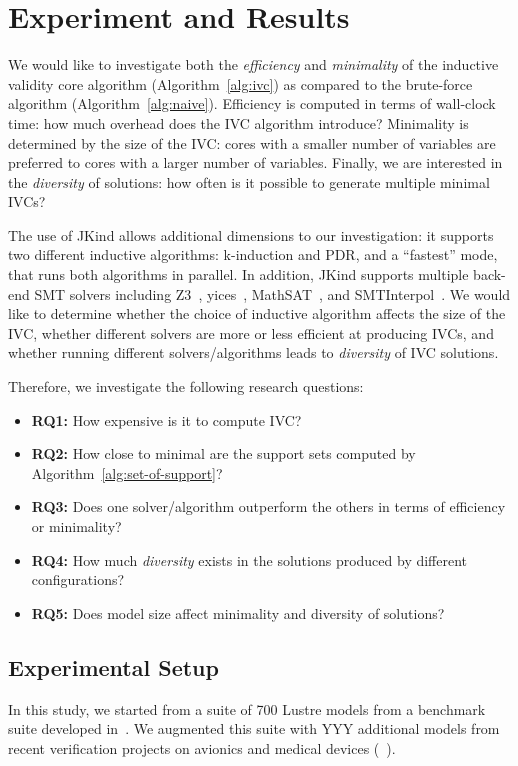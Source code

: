 \section{Experiment and Results}
\label{sec:exprm}

We would like to investigate both the {\em efficiency} and {\em minimality} of the inductive validity core algorithm (Algorithm~\ref{alg:ivc}) as compared to the brute-force algorithm (Algorithm~\ref{alg:naive}).  Efficiency is computed in terms of wall-clock time: how much overhead does the IVC algorithm introduce?  Minimality is determined by the size of the IVC: cores with a smaller number of variables are preferred to cores with a larger number of variables.  Finally, we are interested in the {\em diversity} of solutions: how often is it possible to generate multiple minimal IVCs?

The use of JKind allows additional dimensions to our investigation: it supports two different inductive algorithms: k-induction and PDR, and a ``fastest'' mode, that runs both algorithms in parallel.  In addition, JKind supports multiple back-end SMT solvers including Z3~\cite{}, yices~\cite{}, MathSAT~\cite{}, and SMTInterpol~\cite{}.  We would like to determine whether the choice of inductive algorithm affects the size of the IVC, whether different solvers are more or less efficient at producing IVCs, and whether running different solvers/algorithms leads to {\em diversity} of IVC solutions.

Therefore, we investigate the following research questions:
\begin{itemize}
    \item \textbf{RQ1:} How expensive is it to compute IVC?
    \item \textbf{RQ2:} How close to minimal are the support sets computed by Algorithm~\ref{alg:set-of-support}?
    \item \textbf{RQ3:} Does one solver/algorithm outperform the others in terms of efficiency or minimality?
    \item \textbf{RQ4:} How much {\em diversity} exists in the solutions produced by different configurations?
    \item \textbf{RQ5:} Does model size affect minimality and diversity of solutions?
\end{itemize}

\subsection{Experimental Setup}
In this study, we started from a suite of 700 Lustre models from a benchmark suite developed in~\cite{Hagen08:FMCAD}.  We augmented this suite with YYY additional models from recent verification projects on avionics and medical devices (~\cite{QFCS15:backes,hilt2013}).  

